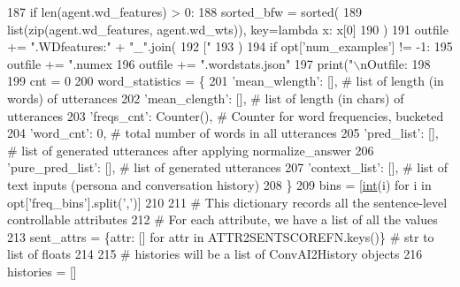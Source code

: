 \begin{DoxyCode}
{{{{{{187         \textcolor{keywordflow}{if} len(agent.wd\_features) > 0:
188             sorted\_bfw = sorted(
189                 list(zip(agent.wd\_features, agent.wd\_wts)), key=\textcolor{keyword}{lambda} x: x[0]
190             )
191             outfile += \textcolor{stringliteral}{".WDfeatures:"} + \textcolor{stringliteral}{"\_"}.join(
192                 [\textcolor{stringliteral}{"%
193             )
194     \textcolor{keywordflow}{if} opt[\textcolor{stringliteral}{'num\_examples'}] != -1:
195         outfile += \textcolor{stringliteral}{".numex%
196     outfile += \textcolor{stringliteral}{".wordstats.json"}
197     print(\textcolor{stringliteral}{"\(\backslash\)nOutfile: %
198 
199     cnt = 0
200     word\_statistics = \{
201         \textcolor{stringliteral}{'mean\_wlength'}: [],  \textcolor{comment}{# list of length (in words) of utterances}
202         \textcolor{stringliteral}{'mean\_clength'}: [],  \textcolor{comment}{# list of length (in chars) of utterances}
203         \textcolor{stringliteral}{'freqs\_cnt'}: Counter(),  \textcolor{comment}{# Counter for word frequencies, bucketed}
204         \textcolor{stringliteral}{'word\_cnt'}: 0,  \textcolor{comment}{# total number of words in all utterances}
205         \textcolor{stringliteral}{'pred\_list'}: [],  \textcolor{comment}{# list of generated utterances after applying normalize\_answer}
206         \textcolor{stringliteral}{'pure\_pred\_list'}: [],  \textcolor{comment}{# list of generated utterances}
207         \textcolor{stringliteral}{'context\_list'}: [],  \textcolor{comment}{# list of text inputs (persona and conversation history)}
208     \}
209     bins = [\hyperlink{namespacelanguage__model_1_1eval__ppl_a7d12ee00479673c5c8d1f6d01faa272a}{int}(i) \textcolor{keywordflow}{for} i \textcolor{keywordflow}{in} opt[\textcolor{stringliteral}{'freq\_bins'}].split(\textcolor{stringliteral}{','})]
210 
211     \textcolor{comment}{# This dictionary records all the sentence-level controllable attributes}
212     \textcolor{comment}{# For each attribute, we have a list of all the values}
213     sent\_attrs = \{attr: [] \textcolor{keywordflow}{for} attr \textcolor{keywordflow}{in} ATTR2SENTSCOREFN.keys()\}  \textcolor{comment}{# str to list of floats}
214 
215     \textcolor{comment}{# histories will be a list of ConvAI2History objects}
216     histories = []
}}}}}}}}}
\end{DoxyCode}
